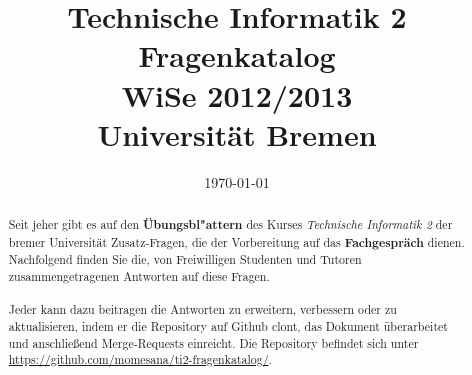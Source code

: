 \documentclass[12pt,a4paper,ngerman]{scrartcl}
\title{Technische Informatik 2 \\ Fragenkatalog \\ WiSe 2012/2013 \\[5pt] \Large{Universität Bremen}}
\date{\today}
\newcommand{\question}[1]{
	\subsection[\truncate{0.85\textwidth}{#1}]{
	\textcolor{blue}{#1}}}
\newenvironment {answer}
                {}
                {}
\begin{document}
\maketitle

\begin{abstract}
Seit jeher gibt es auf den \textbf{Übungsbl"attern} des Kurses \textit{Technische Informatik 2} der bremer Universität Zusatz-Fragen, die der Vorbereitung auf das \textbf{Fachgespräch} dienen. Nachfolgend finden Sie die, von Freiwilligen Studenten und Tutoren zusammengetragenen Antworten auf diese Fragen.

\paragraph*{}
Jeder kann dazu beitragen die Antworten zu erweitern, verbessern oder zu aktualisieren, indem er die Repository auf Github clont, das Dokument überarbeitet und anschließend Merge-Requests einreicht. Die Repository befindet sich unter  \url{https://github.com/momesana/ti2-fragenkatalog/}.
\end{abstract}

\newpage

\tableofcontents 









\end{document}
